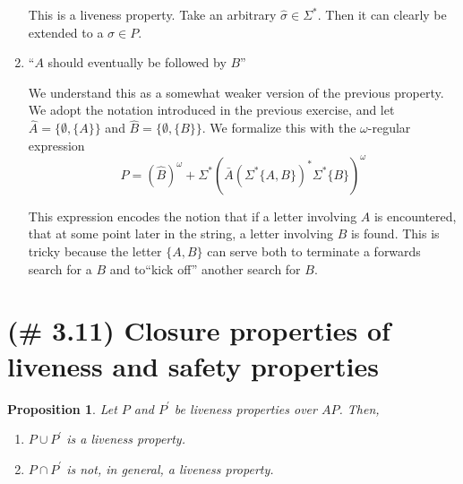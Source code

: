 \documentclass[letterpaper,11pt]{article}
\newtheorem{prop}{Proposition}
\newcommand{\union}{\cup}
\newcommand{\intersn}{\cap}
\begin{document}
\begin{enumerate}
        This is a liveness property. Take an arbitrary $\hat \sigma \in
        \Sigma^*$. Then it can clearly be extended to a $\sigma \in P$.

    \item ``$A$ should eventually be followed by $B$''

        We understand this as a somewhat weaker version of the previous
        property. We adopt the notation introduced in the previous exercise,
        and
        let $\hat A = \{ \emptyset, \{A\} \}$
        and $\hat B = \{ \emptyset, \{B\} \}$.
        We formalize this with the
        $\omega$-regular expression
        \begin{equation*}
            P
            = (\hat B)^\omega
            + \Sigma^* (\bar A (\Sigma^* \{A, B\})^* \Sigma^* \{B\})^\omega
        \end{equation*}

        This expression encodes the notion that if a letter involving $A$ is
        encountered, that at some point later in the string, a letter involving
        $B$ is found. This is tricky because the letter $\{A, B\}$ can serve
        both to terminate a forwards search for a $B$ and to``kick off''
        another search for $B$.
\end{enumerate}

\section{(\# 3.11) Closure properties of liveness and safety properties}

\begin{prop}
    Let $P$ and $P^\prime$ be liveness properties over $AP$. Then,
    \begin{enumerate}
        \item $P \union P^\prime$ is a liveness property.
        \item $P \intersn P^\prime$ is not, in general, a liveness property.
    \end{enumerate}
\end{prop}
\end{document}
